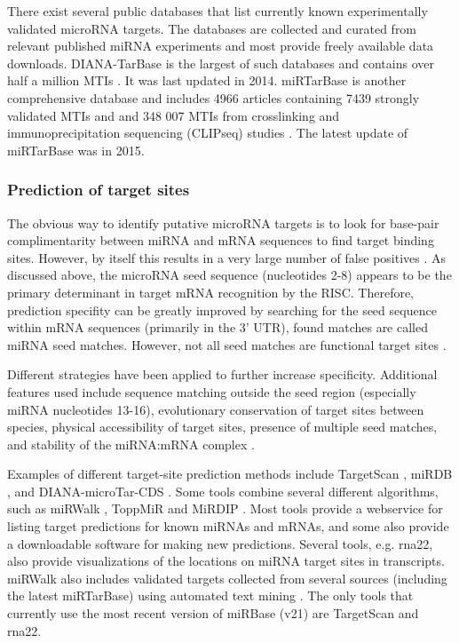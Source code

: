 There exist several public databases that list currently known experimentally
validated microRNA targets. The databases are collected and curated from
relevant published miRNA experiments and most provide freely available data
downloads. DIANA-TarBase is the largest of such databases and contains over
half a million MTIs \citep{Vlachos2015}. It was last updated in 2014.
miRTarBase is another comprehensive database and includes 4966 articles
containing 7439 strongly validated MTIs and and 348 007 MTIs from crosslinking
and immunoprecipitation sequencing (CLIPseq) studies \citep{Chou2016}. The
latest update of miRTarBase was in 2015.



\subsubsection{Prediction of target sites}

The obvious way to identify putative microRNA targets is to look for base-pair
complimentarity between miRNA and mRNA sequences to find target
binding sites. However, by itself this results in a very large number of false
positives \citep{Bartel2009}. As discussed above, the microRNA seed sequence
(nucleotides 2-8) appears to be the primary determinant in target mRNA
recognition by the RISC. Therefore, prediction specifity can be greatly improved by
searching for the seed sequence within mRNA sequences (primarily in the 3'
UTR), found matches are called miRNA seed matches. However,
not all seed matches are functional target sites \citep{Grimson2007}.

Different strategies have been applied to further increase specificity.
Additional features used include sequence matching outside the seed region
(especially miRNA nucleotides 13-16), evolutionary conservation of target
sites between species, physical accessibility of target sites, presence of
multiple seed matches, and stability of the miRNA:mRNA complex
\citep{Akhtar2016}.

Examples of different target-site prediction methods include TargetScan
\citep{Agarwal2015}, miRDB \citep{Wong2015}, and DIANA-microTar-CDS
\citep{Paraskevopoulou2013}. Some tools combine several different algorithms,
such as miRWalk \citep{Dweep2015}, ToppMiR \citep{Wu2014} and MiRDIP
\citep{Shirdel2011}. Most tools provide a webservice for listing target
predictions for known miRNAs and mRNAs, and some also provide a downloadable
software for making new predictions. Several tools, e.g. rna22, also provide
visualizations of the locations on miRNA target sites in transcripts. miRWalk
also includes validated targets collected from several sources (including the
latest miRTarBase) using automated text mining \citep{Dweep2015}. The only
tools that currently use the most recent version of miRBase (v21) are
TargetScan and rna22.

